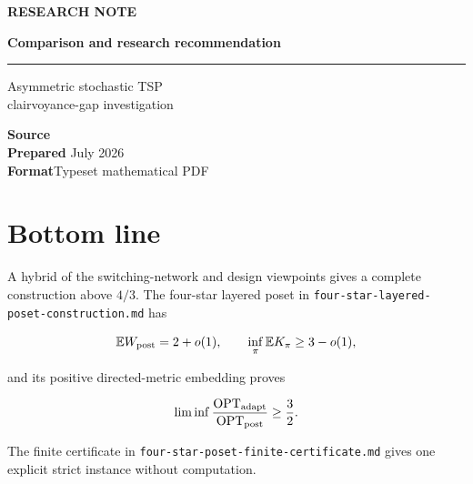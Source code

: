 \documentclass[11pt,a4paper]{article}
\newenvironment{ResearchContents}
  {\begin{tcolorbox}[breakable,colback=SoftBlue,colframe=SoftBlue,arc=2pt]}
  {\end{tcolorbox}}
\begin{document}
\color{BodyGray}
\begin{titlepage}
  \thispagestyle{empty}
  \vspace*{22mm}
  {\sffamily\small\bfseries\color{Accent}\MakeUppercase{Research note}}\par
  \vspace{8mm}
  {\sffamily\fontsize{21}{25}\selectfont\bfseries\color{Navy} Comparison and research recommendation}\par
  \vspace{6mm}
  {\color{Accent}\rule{42mm}{1.4pt}}\par
  \vspace{11mm}
  {\Large\color{BodyGray} Asymmetric stochastic TSP\\
  clairvoyance-gap investigation}\par
  \vfill
  \begin{tcolorbox}[
    colback=SoftBlue,colframe=SoftBlue,arc=2pt,
    left=10pt,right=10pt,top=8pt,bottom=8pt]
    \sffamily
    \textbf{Source}\quad {}\\[3pt]
    \textbf{Prepared} July 2026\\[3pt]
    \textbf{Format}\quad Typeset mathematical PDF
  \end{tcolorbox}
  \vspace{12mm}
\end{titlepage}

\begin{ResearchContents}
\tableofcontents
\end{ResearchContents}
\clearpage

\section*{Bottom line}

A hybrid of the switching-network and design viewpoints gives a complete construction above \(4/3\).  The four-star layered poset in \nolinkurl{four-star-layered-poset-construction.md} has


\[
 \mathbb E W_{\rm post}=2+o(1),\qquad
 \inf_\pi\mathbb E K_\pi\ge3-o(1),
\]

and its positive directed-metric embedding proves


\[
 \liminf
 \frac{\operatorname{OPT}_{\rm adapt}}
      {\operatorname{OPT}_{\rm post}}\ge\frac32.
\]

The finite certificate in \nolinkurl{four-star-poset-finite-certificate.md} gives one explicit strict instance without computation.
\end{document}
